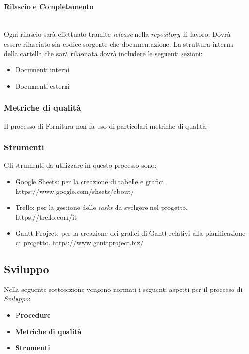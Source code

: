 \paragraph{Rilascio e Completamento}
\mbox{} \\
Ogni rilascio sarà effettuato tramite \textit{release} nella \textit{repository} di lavoro.
Dovrà essere rilasciato sia codice sorgente che documentazione.
La struttura interna della cartella che sarà rilasciata dovrà includere le seguenti sezioni:
\begin{itemize}
    \item Documenti interni 
    \item Documenti esterni
\end{itemize}

\subsubsection{Metriche di qualità}
Il processo di Fornitura non fa uso di particolari metriche di qualità.

\subsubsection{Strumenti}
Gli strumenti da utilizzare in questo processo sono:

\begin{itemize}
    \item Google Sheets: per la creazione di tabelle e grafici \\
    https://www.google.com/sheets/about/
    \item Trello: per la gestione delle \textit{tasks} da svolgere nel progetto.\\
    https://trello.com/it
    \item Gantt Project: per la creazione dei grafici di Gantt relativi alla pianificazione di progetto.
    https://www.ganttproject.biz/
\end{itemize}

\subsection{Sviluppo}
Nella seguente sottosezione vengono normati i seguenti aspetti per il 
processo di \textit{Sviluppo}:
\begin{itemize}
    \item \textbf{Procedure}
    \item \textbf{Metriche di qualità}
    \item \textbf{Strumenti}
\end{itemize}


